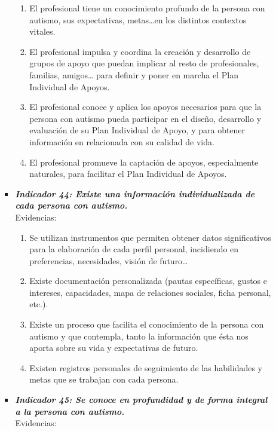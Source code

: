 \begin{itemize}
\begin{itemize}
\begin{itemize}
			\begin{enumerate}
				\item El profesional tiene un conocimiento profundo de la persona con autismo, sus expectativas, metas…en los distintos contextos vitales. 
				\item El profesional impulsa y coordina la creación y desarrollo de grupos de apoyo que puedan implicar al resto de profesionales, familias, amigos… para definir y poner en marcha el Plan Individual de Apoyos. 
				\item El profesional conoce y aplica los apoyos necesarios para que la persona con autismo pueda participar en el diseño, desarrollo y evaluación de su Plan Individual de Apoyo, y para obtener información en relacionada con su calidad de vida. 
				\item El profesional promueve la captación de apoyos, especialmente naturales, para facilitar el Plan Individual de Apoyos. 
				 
			\end{enumerate}
			\item \textbf{\textit{Indicador 44: Existe una información individualizada de cada persona con autismo.}}\\Evidencias:
			
			\begin{enumerate}
				\item Se utilizan instrumentos que permiten obtener datos significativos para la elaboración de cada perfil personal, incidiendo en preferencias, necesidades, visión de futuro… 
				\item Existe documentación personalizada (pautas específicas, gustos e intereses, capacidades, mapa de relaciones sociales, ficha personal, etc.). 
				\item Existe un proceso que facilita el conocimiento de la persona con autismo y que contempla, tanto la información que ésta nos aporta sobre su vida y expectativas de futuro. 
				\item Existen registros personales de seguimiento de las habilidades y metas que se trabajan con cada persona. 
				 
			\end{enumerate}
			\item \textbf{\textit{Indicador 45: Se conoce en profundidad y de forma integral a la persona con autismo.}}\\Evidencias:
			

\end{itemize}
\end{itemize}
\end{itemize}
